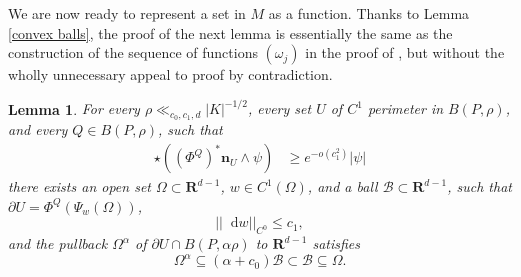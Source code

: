 \documentclass[reqno,10pt]{amsart}
\newcommand{\RR}{\mathbf{R}}
\newcommand*\dif{\mathop{}\!\mathrm{d}}
\newcommand{\normal}{\mathbf n}
\newtheorem{lemma}[theorem]{Lemma}
\theoremstyle{definition}
\numberwithin{equation}{section}
\begin{document}
We are now ready to represent a set in $M$ as a function.
Thanks to Lemma \ref{convex balls}, the proof of the next lemma is essentially the same as the construction of the sequence of functions $(\omega_j)$ in the proof of \cite[Lemma 6.4]{Giusti77}, but without the wholly unnecessary appeal to proof by contradiction.

\begin{lemma}\label{rep as a good graph}
For every $\rho \ll_{c_0, c_1, d} |K|^{-1/2}$, every set $U$ of $C^1$ perimeter in $B(P, \rho)$, and every $Q \in B(P, \rho)$, such that
\begin{align}
\star((\Phi^Q)^* \normal_U \wedge \psi) &\geq e^{-o(c_1^2)} |\psi| \label{rep as a good graph hyp}
\end{align}
there exists an open set $\Omega \subset \RR^{d - 1}$, $w \in C^1(\Omega)$, and a ball $\mathscr B \subset \RR^{d - 1}$, such that $\partial U = \Phi^Q(\Psi_w(\Omega))$,
\begin{equation}\label{rep as a good graph small derivative}
||\dif w||_{C^0} \leq c_1,
\end{equation}
and the pullback $\Omega^\alpha$ of $\partial U \cap B(P, \alpha \rho)$ to $\RR^{d - 1}$ satisfies
\begin{equation}\label{rep as a good graph set nests}
    \Omega^\alpha \subseteq (\alpha + c_0) \mathscr B \subset \mathscr B \subseteq \Omega.
\end{equation}
\end{lemma}
\end{document}

